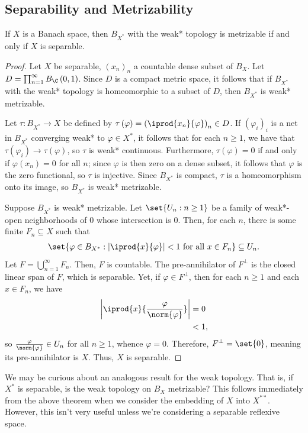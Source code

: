 \documentclass[10pt]{mypackage}
\begin{document}
\subsection{Separability and Metrizability}%
\begin{theorem}
  If $X$ is a Banach space, then $B_{X^{\ast}}$ with the weak* topology is metrizable if and only if $X$ is separable.
\end{theorem}
\begin{proof}
  Let $X$ be separable, $\left( x_n \right)_n$ a countable dense subset of $B_X$. Let $D = \prod_{n=1}^{\infty} B_{\C}\left( 0,1 \right)$. Since $D$ is a compact metric space, it follows that if $B_{X^{\ast}}$ with the weak* topology is homeomorphic to a subset of $D$, then $B_{X^{\ast}}$ is weak* metrizable.

  Let $\tau\colon B_{X^{\ast}}\rightarrow X$ be defined by $\tau\left( \varphi \right) = \left( \iprod{x_n}{\varphi} \right)_{n}\in D$. If $\left( \varphi_i \right)_i$ is a net in $B_{X^{\ast}}$ converging weak* to $\varphi\in X^{\ast}$, it follows that for each $n\geq 1$, we have that $\tau\left( \varphi_i \right)\rightarrow \tau\left( \varphi \right)$, so $\tau$ is weak* continuous. Furthermore, $\tau(\varphi) = 0$ if and only if $\varphi\left( x_n \right) = 0$ for all $n$; since $\varphi$ is then zero on a dense subset, it follows that $\varphi$ is the zero functional, so $\tau$ is injective. Since $B_{X^{\ast}}$ is compact, $\tau$ is a homeomorphism onto its image, so $B_{X^{\ast}}$ is weak* metrizable.

  Suppose $B_{X^{\ast}}$ is weak* metrizable. Let $\set{U_n : n\geq 1}$ be a family of weak*-open neighborhoods of $0$ whose intersection is $0$. Then, for each $n$, there is some finite $F_n\subseteq X$ such that
  \begin{align*}
    \set{\varphi\in B_{X^{\ast}} : \left\vert \iprod{x}{\varphi} \right\vert < 1\text{ for all }x\in F_n} \subseteq U_n.
  \end{align*}
  Let $F = \bigcup_{n=1}^{\infty}F_n$. Then, $F$ is countable. The pre-annihilator of $F^{\perp}$ is the closed linear span of $F$, which is separable. Yet, if $\varphi\in F^{\perp}$, then for each $n\geq 1$ and each $x\in F_n$, we have
  \begin{align*}
    \left\vert \iprod{x}{\frac{\varphi}{\norm{\varphi}}} \right\vert &= 0\\
                                                                     &< 1,
  \end{align*}
  so $\frac{\varphi}{\norm{\varphi}}\in U_n$ for all $n\geq 1$, whence $\varphi = 0$. Therefore, $F^{\perp} = \set{0}$, meaning its pre-annihilator is $X$. Thus, $X$ is separable.
\end{proof}
We may be curious about an analogous result for the weak topology. That is, if $X^{\ast}$ is separable, is the weak topology on $B_X$ metrizable? This follows immediately from the above theorem when we consider the embedding of $X$ into $X^{\ast\ast}$. However, this isn't very useful unless we're considering a separable reflexive space.
\end{document}
